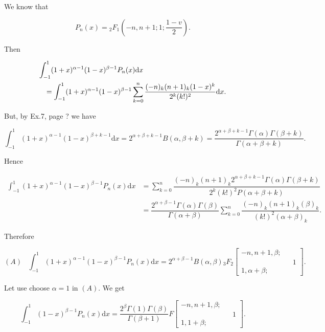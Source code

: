 \begin{solution}
We know that

$$P_n(x) = {}_2F_1 \left(-n,n+1;1;\dfrac{1-v}{2} \right).$$

Then

\begin{eqnarray*}
\lefteqn{\displaystyle\int_{-1}^1 (1+x)^{\alpha-1} (1-x)^{\beta - 1} P_n(x) \mathrm{d}x} \\
&& = \displaystyle\int_{-1}^1 (1+x)^{\alpha-1} (1-x)^{\beta - 1} \displaystyle\sum_{k=0}^n \dfrac{(-n)_k (n+1)_k (1-x)^k}{2^k (k!)^2} \mathrm{d}x.
\end{eqnarray*}

But, by Ex.7, page ? we have

$$\displaystyle\int_{-1}^1 (1+x)^{\alpha-1}(1-x)^{\beta + k-1} \mathrm{d}x = 2^{\alpha+\beta+k-1} B(\alpha, \beta+k) = \dfrac{2^{\alpha+\beta+k-1} \Gamma(\alpha) \Gamma(\beta + k)}{\Gamma(\alpha + \beta + k)}.$$

Hence

$$\begin{array}{ll}
\displaystyle\int_{-1}^1 (1+x)^{\alpha-1}(1-x)^{\beta - 1} P_n(x) \mathrm{d}x &= \displaystyle\sum_{k=0}^n \dfrac{(-n)_k (n+1)_k 2^{\alpha + \beta + k-1} \Gamma(\alpha) \Gamma(\beta + k)}{2^k (k!)^2 P(\alpha+\beta+k)} \\
&= \dfrac{2^{\alpha+\beta-1} \Gamma(\alpha) \Gamma(\beta)}{\Gamma(\alpha + \beta)} \displaystyle\sum_{k=0}^n \dfrac{(-n)_k (n+1)_k (\beta)_k}{(k!)^2 (\alpha + \beta)_k}.
\end{array}$$

Therefore

$$(A) \hspace{10pt} \displaystyle\int_{-1}^1 (1+x)^{\alpha-1} (1-x)^{\beta - 1} P_n(x) \mathrm{d}x = 2^{\alpha + \beta -1} B(\alpha, \beta) {}_3F_2 \left[ \begin{array}{rlr}
-n, n+1, \beta; & & \\
& & 1 \\
1, \alpha + \beta; & &
\end{array} \right].$$

Let use choose $\alpha = 1$ in $(A)$. We get

$$\displaystyle\int_{-1}^1 (1-x)^{\beta-1} P_n(x) \mathrm{d}x = \dfrac{2^{\beta} \Gamma(1) \Gamma(\beta)}{\Gamma(\beta + 1)} F \left[ \begin{array}{rlr}
-n, n+1, \beta; & & \\
& & 1 \\
1, 1 + \beta; & & 
\end{array} \right].$$


\end{solution}

